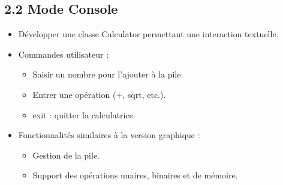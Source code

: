 \documentclass[12pt]{report}
\begin{document}
            \subsection*{2.2 Mode Console}
                \begin{itemize}
                    \item Développer une classe Calculator permettant une interaction textuelle.
                    \item Commandes utilisateur :
                    \begin{itemize}
                        \item Saisir un nombre pour l’ajouter à la pile.
                        \item Entrer une opération (+, sqrt, etc.).
                        \item exit : quitter la calculatrice.
                    \end{itemize}

                    \item Fonctionnalités similaires à la version graphique :
                    \begin{itemize}
                        \item Gestion de la pile.
                        \item Support des opérations unaires, binaires et de mémoire.
                    \end{itemize}
                \end{itemize}
\end{document}

